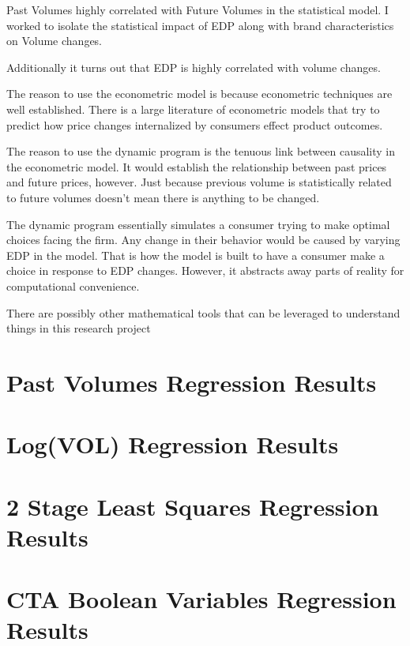 \documentclass{article}
\begin{document}
Past Volumes highly correlated with Future Volumes in the statistical model. I worked to isolate the statistical impact of EDP along with brand characteristics on Volume changes.

Additionally it turns out that EDP is highly correlated with volume changes.

The reason to use the econometric model is because econometric techniques are well established. There is a large literature of econometric models that try to predict how price changes internalized by consumers effect product outcomes.

The reason to use the dynamic program is the tenuous link between causality in the econometric model. It would establish the relationship between past prices and future prices, however. Just because previous volume is statistically related to future volumes doesn't mean there is anything to be changed. 


The dynamic program essentially simulates a consumer trying to make optimal choices facing the firm. Any change in their behavior would be caused by varying EDP in the model. That is how the model is built to have a consumer make a choice in response to EDP changes. However, it abstracts away parts of reality for computational convenience.

There are possibly other mathematical tools that can be leveraged to understand things in this research project


\pagebreak

{}


\pagebreak

\begin{appendices}
\section{Past Volumes Regression Results}


\section{Log(VOL) Regression Results}


\section{2 Stage Least Squares Regression Results}


\section{CTA Boolean Variables Regression Results}



\end{appendices}
\end{document}
